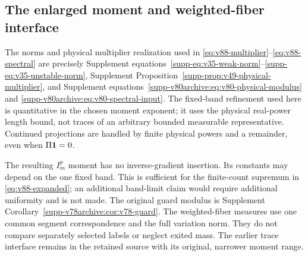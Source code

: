 
\subsection{The enlarged moment and weighted-fiber interface}
The norms and physical multiplier realization used in
\eqref{eq:v88-multiplier}--\eqref{eq:v88-spectral} are precisely
Supplement equations~\eqref{supp-eq:v35-weak-norm}--\eqref{supp-eq:v35-unstable-norm},
Supplement Proposition~\ref{supp-prop:v49-physical-multiplier}, and
Supplement equations~\eqref{supp-v80archive:eq:v80-physical-modulus}
and \eqref{supp-v80archive:eq:v80-spectral-input}. The fixed-band
refinement used here is quantitative in the chosen moment exponent;
it uses the physical real-power length bound, not traces of an arbitrary
bounded measurable representative. Continued projections are handled by
finite physical powers and a remainder, even when $\Pi\mathbf1=0$.

The resulting $I_m^p$ moment has no inverse-gradient insertion. Its
constants may depend on the one fixed band. This is sufficient for the
finite-count supremum in \eqref{eq:v88-expanded}; an additional
band-limit claim would require additional uniformity and is not made.
The original guard modulus is Supplement
Corollary~\ref{supp-v78archive:cor:v78-guard}. The weighted-fiber
measures use one common segment correspondence and the full variation
norm. They do not compare separately selected labels or neglect exited
mass. The earlier trace interface remains in the retained source with
its original, narrower moment range.
